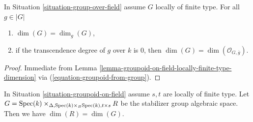 \begin{lemma}
\label{lemma-group-over-field-locally-finite-type-dimension}
In
Situation \ref{situation-group-over-field}
assume $G$ locally of finite type.
For all $g \in |G|$
\begin{enumerate}
\item $\dim(G) = \dim_g(G)$,
\item if the transcendence degree of $g$ over $k$ is $0$, then
$\dim(G) = \dim(\mathcal{O}_{G, \overline{g}})$.
\end{enumerate}
\end{lemma}

\begin{proof}
Immediate from
Lemma \ref{lemma-groupoid-on-field-locally-finite-type-dimension}
via (\ref{equation-groupoid-from-group}).
\end{proof}

\begin{lemma}
\label{lemma-groupoid-on-field-dimension-equal-stabilizer}
In
Situation \ref{situation-groupoid-on-field}
assume $s, t$ are locally of finite type.
Let
$G = \mathop{\mathrm{Spec}}(k)
\times_{\Delta, \mathop{\mathrm{Spec}}(k) \times_B \mathop{\mathrm{Spec}}(k), t \times s} R$
be the stabilizer group algebraic space.
Then we have $\dim(R) = \dim(G)$.
\end{lemma}

